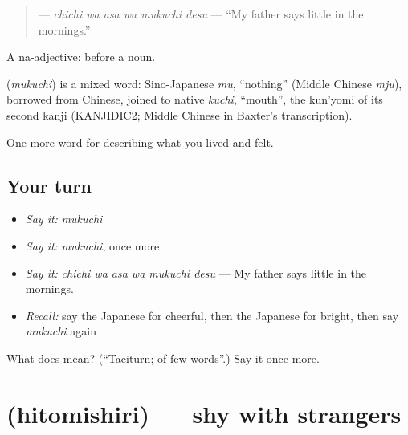 \begin{quote}
\textbf{  } — \emph{chichi wa asa wa mukuchi desu} — \textquotedblleft{}My father says little in the mornings.\textquotedblright{}
\end{quote}

A na-adjective:  before a noun.

\begin{cousinweb}
\textbf{} (\emph{mukuchi}) is a mixed word: Sino-Japanese \emph{mu}, \textquotedblleft{}nothing\textquotedblright{} (Middle Chinese \emph{mju}), borrowed from Chinese, joined to native \emph{kuchi}, \textquotedblleft{}mouth\textquotedblright{}, the kun'yomi of its second kanji (KANJIDIC2; Middle Chinese in Baxter's transcription).
\end{cousinweb}

\begin{grammarlens}[title={What you've built}]
One more word for describing what you lived and felt.
\end{grammarlens}

\subsection*{Your turn}
\begin{itemize}
\raggedright
  \item \emph{Say it:} \emph{mukuchi}
  \item \emph{Say it:} \emph{mukuchi}, once more
  \item \emph{Say it:} \emph{chichi wa asa wa mukuchi desu} — My father says little in the mornings.
  \item \emph{Recall:} say the Japanese for cheerful, then the Japanese for bright, then say \emph{mukuchi} again
\end{itemize}

\begin{tcolorbox}[breakable,colback=teal!4,colframe=teal!35!black,title={Before you move on}]
What does  mean? (\textquotedblleft{}Taciturn; of few words\textquotedblright{}.) Say it once more.
\end{tcolorbox}
\section[\texorpdfstring{\ja{ひとみしり} (hitomishiri)}{ひとみしり (hitomishiri)}]{ (hitomishiri) — shy with strangers}

\label{lesson:JA-C436-hitomishiri}



